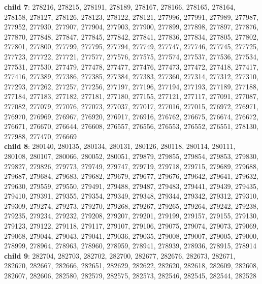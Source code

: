 \begin{itemize}
	\textbf{child 7}:  278216, 278215, 278191, 278189, 278167, 278166, 278165, 278164, 278158, 278127, 278126, 278123, 278122, 278121, 277996, 277991, 277989, 277987, 277952, 277930, 277907, 277904, 277903, 277900, 277899, 277898, 277897, 277876, 277870, 277848, 277847, 277845, 277842, 277841, 277836, 277834, 277805, 277802, 277801, 277800, 277799, 277795, 277794, 277749, 277747, 277746, 277745, 277725, 277723, 277722, 277721, 277577, 277576, 277575, 277574, 277537, 277536, 277534, 277531, 277530, 277479, 277478, 277477, 277476, 277473, 277472, 277418, 277417, 277416, 277389, 277386, 277385, 277384, 277383, 277360, 277314, 277312, 277310, 277293, 277262, 277257, 277256, 277197, 277196, 277194, 277193, 277189, 277188, 277184, 277183, 277182, 277181, 277180, 277155, 277121, 277117, 277091, 277087, 277082, 277079, 277076, 277073, 277037, 277017, 277016, 277015, 276972, 276971, 276970, 276969, 276967, 276920, 276917, 276916, 276762, 276675, 276674, 276672, 276671, 276670, 276644, 276608, 276557, 276556, 276553, 276552, 276551, 278130, 277988, 277470, 276669 \\
	\textbf{child 8}: 280140, 280135, 280134, 280131, 280126, 280118, 280114, 280111, 280108, 280107, 280066, 280052, 280051, 279879, 279855, 279854, 279853, 279830, 279827, 279826, 279773, 279749, 279747, 279719, 279718, 279715, 279689, 279688, 279687, 279684, 279683, 279682, 279679, 279677, 279676, 279642, 279641, 279632, 279630, 279559, 279550, 279491, 279488, 279487, 279483, 279441, 279439, 279435, 279410, 279391, 279355, 279354, 279349, 279348, 279344, 279342, 279312, 279310, 279309, 279274, 279273, 279270, 279268, 279267, 279265, 279264, 279242, 279238, 279235, 279234, 279232, 279208, 279207, 279201, 279199, 279157, 279155, 279130, 279123, 279122, 279118, 279117, 279107, 279106, 279075, 279074, 279073, 279069, 279068, 279044, 279043, 279041, 279036, 279035, 279008, 279007, 279005, 279000, 278999, 278964, 278963, 278960, 278959, 278941, 278939, 278936, 278915, 278914 \\
	\textbf{child 9}: 282704, 282703, 282702, 282700, 282677, 282676, 282673, 282671, 282670, 282667, 282666, 282651, 282629, 282622, 282620, 282618, 282609, 282608, 282607, 282606, 282580, 282579, 282575, 282573, 282546, 282545, 282544, 282528 \\

\end{itemize}
